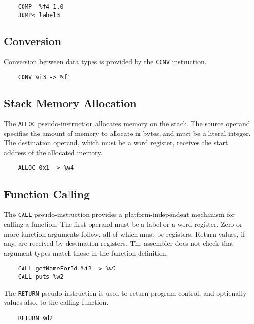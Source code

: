 \begin{verbatim}
    COMP  %f4 1.0
    JUMP< label3
\end{verbatim}

\subsection{Conversion}

Conversion between data types is provided by the
\texttt{CONV} instruction.

\begin{verbatim}
    CONV %i3 -> %f1
\end{verbatim}

\subsection{Stack Memory Allocation}

The \texttt{ALLOC} pseudo-instruction allocates memory
on the stack. The source operand
specifies the amount of memory to allocate in bytes,
and must be a literal integer. The destination operand, which must
be a word register, receives the start address of the
allocated memory.

\begin{verbatim}
    ALLOC 0x1 -> %w4
\end{verbatim}

\subsection{Function Calling}

The \texttt{CALL} pseudo-instruction provides a platform-independent
mechanism for calling a function. The first operand must be
a label or a word register. Zero or more function arguments follow,
all of which must be registers. Return values, if any, are received
by destination registers.
The assembler does not check that argument types match those
in the function definition.

\begin{verbatim}
    CALL getNameForId %i3 -> %w2
    CALL puts %w2
\end{verbatim}

The \texttt{RETURN} pseudo-instruction is used to return program
control, and optionally values also, to the calling function.

\begin{verbatim}
    RETURN %d2
\end{verbatim}

